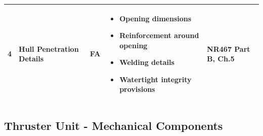 \documentclass[11pt,a4paper]{report}
\newcommand{\fa}{\textbf{\textcolor{warningred}{FA}}}
\begin{document}
\begin{longtable}{|p{0.5cm}|p{5cm}|p{1.5cm}|p{5.5cm}|p{2cm}|}
4 & Hull Penetration Details & \fa{} & 
\begin{itemize}[leftmargin=*,nosep]
\item Opening dimensions
\item Reinforcement around opening
\item Welding details
\item Watertight integrity provisions
\end{itemize} & NR467 Part B, Ch.5 \\
\hline

\end{longtable}

\subsection{Thruster Unit - Mechanical Components}
\end{document}
